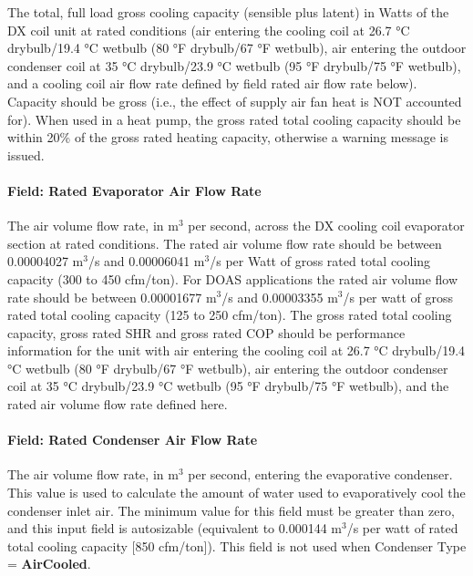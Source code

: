 The total, full load gross cooling capacity (sensible plus latent) in Watts of the DX coil unit at rated conditions (air entering the cooling coil at 26.7 °C drybulb/19.4 °C wetbulb (80 °F drybulb/67 °F wetbulb), air entering the outdoor condenser coil at 35 °C drybulb/23.9 °C wetbulb (95 °F drybulb/75 °F wetbulb), and a cooling coil air flow rate defined by field rated air flow rate below). Capacity should be gross (i.e., the effect of supply air fan heat is NOT accounted for). When used in a heat pump, the gross rated total cooling capacity should be within 20\% of the gross rated heating capacity, otherwise a warning message is issued.

\paragraph{Field: Rated Evaporator Air Flow Rate}\label{field-rated-evaporator-air-flow-rate-2}

The air volume flow rate, in m\(^{3}\) per second, across the DX cooling coil evaporator section at rated conditions. The rated air volume flow rate should be between 0.00004027 m\(^{3}\)/s and 0.00006041 m\(^{3}\)/s per Watt of gross rated total cooling capacity (300 to 450 cfm/ton). For DOAS applications the rated air volume flow rate should be between 0.00001677 m\(^{3}\)/s and 0.00003355 m\(^{3}\)/s per watt of gross rated total cooling capacity (125 to 250 cfm/ton). The gross rated total cooling capacity, gross rated SHR and gross rated COP should be performance information for the unit with air entering the cooling coil at 26.7 °C drybulb/19.4 °C wetbulb (80 °F drybulb/67 °F wetbulb), air entering the outdoor condenser coil at 35 °C drybulb/23.9 °C wetbulb (95 °F drybulb/75 °F wetbulb), and the rated air volume flow rate defined here.

\paragraph{Field: Rated Condenser Air Flow Rate}\label{field-rated-condenser-air-flow-rate-2}

The air volume flow rate, in m\(^{3}\) per second, entering the evaporative condenser. This value is used to calculate the amount of water used to evaporatively cool the condenser inlet air. The minimum value for this field must be greater than zero, and this input field is autosizable (equivalent to 0.000144 m\(^{3}\)/s per watt of rated total cooling capacity {[}850 cfm/ton{]}). This field is not used when Condenser Type = \textbf{AirCooled}.

